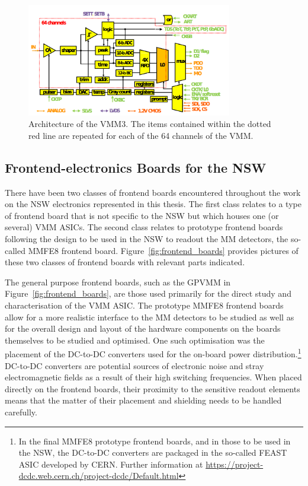 \begin{figure}[!htb]
    \begin{center}
        \includegraphics[width=0.8\textwidth]{figures/nsw/vmm/vmm3_channel}
        \caption{
            Architecture of the VMM3.
            The items contained within the dotted red line are repeated
            for each of the 64 channels of the VMM.
        }
        \label{fig:vmm3_channel}
    \end{center}
\end{figure}

\subsection{Frontend-electronics Boards for the NSW}
\label{sec:nsw_boards}

There have been two classes of frontend boards encountered
throughout the work on the NSW electronics represented in this thesis.
The first class relates to a type of frontend board that is not specific to the NSW
but which houses one (or several) VMM ASICs.
The second class relates to prototype frontend boards following the design to be used
in the NSW to readout the MM detectors, the so-called MMFE8 frontend board.
Figure~\ref{fig:frontend_boards} provides pictures of these two classes of frontend
boards with relevant parts indicated.

The general purpose frontend boards, such as the GPVMM in Figure~\ref{fig:frontend_boards}, are those used primarily for the direct study
and characterisation of the VMM ASIC.
The prototype MMFE8 frontend boards allow for a more realistic interface to the MM
detectors to be studied as well as for the overall design and layout of the hardware components on the
boards themselves to be studied and optimised.
One such optimisation was the placement of the DC-to-DC converters used for the on-board power distribution.\footnote{In the
final MMFE8 prototype frontend boards, and in those to be used in the NSW,
the DC-to-DC converters are packaged in the so-called FEAST ASIC developed by CERN.
Further information at \url{https://project-dcdc.web.cern.ch/project-dcdc/Default.html}}
DC-to-DC converters are potential sources of electronic noise and stray electromagnetic fields as a result of
their high switching frequencies.
When placed directly on the frontend boards, their proximity to the sensitive readout
elements means that the matter of their placement and shielding needs to be handled carefully.

